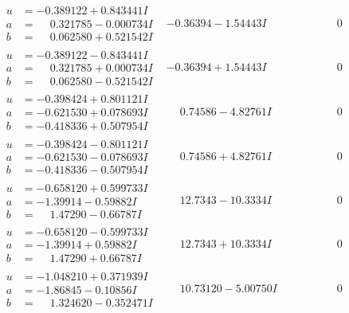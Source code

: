 \documentclass[1p]{elsarticle_modified}
\theoremstyle{definition}
\begin{document}
$$\begin{array}{c|c|c}
\begin{aligned}
u &= -0.389122 + 0.843441 I \\
a &= \phantom{-}0.321785 - 0.000734 I \\
b &= \phantom{-}0.062580 + 0.521542 I\end{aligned}
 & -0.36394 - 1.54443 I & \phantom{-0.000000 } 0 \\ \hline\begin{aligned}
u &= -0.389122 - 0.843441 I \\
a &= \phantom{-}0.321785 + 0.000734 I \\
b &= \phantom{-}0.062580 - 0.521542 I\end{aligned}
 & -0.36394 + 1.54443 I & \phantom{-0.000000 } 0 \\ \hline\begin{aligned}
u &= -0.398424 + 0.801121 I \\
a &= -0.621530 + 0.078693 I \\
b &= -0.418336 + 0.507954 I\end{aligned}
 & \phantom{-}0.74586 - 4.82761 I & \phantom{-0.000000 } 0 \\ \hline\begin{aligned}
u &= -0.398424 - 0.801121 I \\
a &= -0.621530 - 0.078693 I \\
b &= -0.418336 - 0.507954 I\end{aligned}
 & \phantom{-}0.74586 + 4.82761 I & \phantom{-0.000000 } 0 \\ \hline\begin{aligned}
u &= -0.658120 + 0.599733 I \\
a &= -1.39914 - 0.59882 I \\
b &= \phantom{-}1.47290 - 0.66787 I\end{aligned}
 & \phantom{-}12.7343 - 10.3334 I & \phantom{-0.000000 } 0 \\ \hline\begin{aligned}
u &= -0.658120 - 0.599733 I \\
a &= -1.39914 + 0.59882 I \\
b &= \phantom{-}1.47290 + 0.66787 I\end{aligned}
 & \phantom{-}12.7343 + 10.3334 I & \phantom{-0.000000 } 0 \\ \hline\begin{aligned}
u &= -1.048210 + 0.371939 I \\
a &= -1.86845 - 0.10856 I \\
b &= \phantom{-}1.324620 - 0.352471 I\end{aligned}
 & \phantom{-}10.73120 - 5.00750 I & \phantom{-0.000000 } 0 \\ \hline\begin{aligned}

\end{aligned}
\end{array}$$
\end{document}
